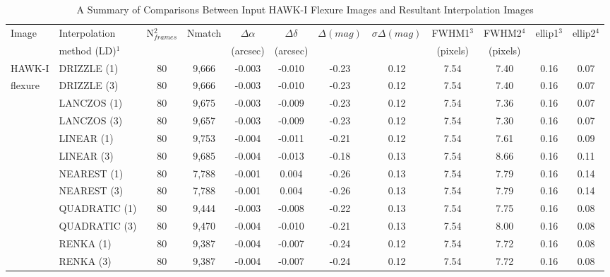 \begin{table}

\caption{A Summary of Comparisons Between Input HAWK-I Flexure Images and Resultant Interpolation Images}

\begin{center}
\begin{tabular}{|l|l|c|c|c|c|c|c|c|c|c|c|}                      
\toprule

Image         				     		     & Interpolation	 & N$_{frames}^2$   & Nmatch & $\Delta\alpha$  & $\Delta\delta$ &  $\Delta(mag)$ & $\sigma\Delta(mag)$ & FWHM1$^3$  & FWHM2$^4$  & ellip1$^3$  & ellip2$^4$  \\
                                     & method (LD)$^1$ &                         &               & (arcsec)            & (arcsec)          &                          &                                   & (pixels)    & (pixels)   &            & \\
\midrule
HAWK-I            & DRIZZLE (1)        & 80    	& 9,666 	& -0.003       & -0.010  	& -0.23 & 0.12          & 7.54  & 7.40  		& 0.16  & 0.07     \\
flexure 	   	& DRIZZLE (3)        & 80    	& 9,666 	& -0.003       & -0.010  	& -0.23 & 0.12 	  	& 7.54  & 7.40  		& 0.16  & 0.07  \\
 	               	& LANCZOS (1)      & 80    	& 9,675 	& -0.003       & -0.009  	& -0.23 & 0.12          & 7.54  & 7.36  		& 0.16  & 0.07   \\
 	   	      	& LANCZOS (3)      & 80    	& 9,657 	& -0.003       & -0.009  	& -0.23 & 0.12          & 7.54  & 7.30  		& 0.16  & 0.07     \\
 	              	& LINEAR (1)          & 80      	& 9,753 	& -0.004       & -0.011  	& -0.21 & 0.12          & 7.54  & 7.61  		& 0.16  & 0.09     \\
 	              	& LINEAR (3)          & 80      	& 9,685 	& -0.004       & -0.013  	& -0.18 & 0.13          & 7.54  & 8.66  		& 0.16  & 0.11     \\
 	              	& NEAREST (1)      & 80     	& 7,788 	& -0.001       & 0.004  	& -0.26 & 0.13          & 7.54  & 7.79  		& 0.16  & 0.14     \\
 	              	& NEAREST (3)      & 80     	& 7,788 	& -0.001       & 0.004  	& -0.26 & 0.13          & 7.54  & 7.79  		& 0.16  & 0.14     \\
 	              	& QUADRATIC (1)  & 80   	& 9,444 	& -0.003       & -0.008  	& -0.22 & 0.13         & 7.54  & 7.75  		& 0.16  & 0.08     \\
 	              	& QUADRATIC (3)  & 80   	& 9,470 	& -0.004       & -0.010  	& -0.21 & 0.13          & 7.54  & 8.00   		& 0.16  & 0.08     \\
 	              	& RENKA (1)           & 80   	& 9,387 	& -0.004       & -0.007  	& -0.24 & 0.12         & 7.54  & 7.72 		& 0.16  & 0.08     \\
                		& RENKA (3)           & 80    	& 9,387 	& -0.004       & -0.007  	& -0.24 & 0.12          & 7.54  & 7.72  		& 0.16  & 0.08     \\
\bottomrule



\end{tabular}
\end{center}
\end{table}
